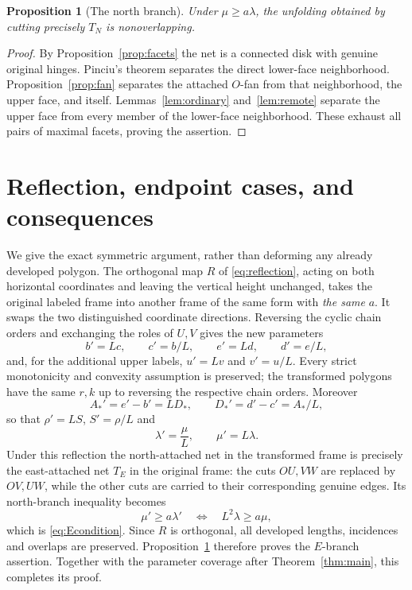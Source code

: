 \documentclass[a4paper,11pt]{amsart}
\newtheorem{proposition}[theorem]{Proposition}
\begin{document}
\begin{proposition}[The north branch]\label{prop:north}
Under $\mu\geq a\lambda$, the unfolding obtained by cutting precisely $T_N$ is nonoverlapping.
\end{proposition}
\begin{proof}
By Proposition~\ref{prop:facets} the net is a connected disk with genuine original hinges. Pinciu's theorem separates the direct lower-face neighborhood. Proposition~\ref{prop:fan} separates the attached $O$-fan from that neighborhood, the upper face, and itself. Lemmas~\ref{lem:ordinary} and~\ref{lem:remote} separate the upper face from every member of the lower-face neighborhood. These exhaust all pairs of maximal facets, proving the assertion.
\end{proof}

\section{Reflection, endpoint cases, and consequences}
We give the exact symmetric argument, rather than deforming any already developed polygon. The orthogonal map $R$ of \eqref{eq:reflection}, acting on both horizontal coordinates and leaving the vertical height unchanged, takes the original labeled frame into another frame of the same form with \emph{the same} $a$. It swaps the two distinguished coordinate directions. Reversing the cyclic chain orders and exchanging the roles of $U,V$ gives the new parameters
\[
 b'=Lc,\qquad c'=b/L,\qquad
 e'=Ld,\qquad d'=e/L,
\]
and, for the additional upper labels, $u'=Lv$ and $v'=u/L$. Every strict monotonicity and convexity assumption is preserved; the transformed polygons have the same $r,k$ up to reversing the respective chain orders. Moreover
\[
 A_*'=e'-b'=LD_*,\qquad
 D_*'=d'-c'=A_*/L,
\]
so that $\rho'=LS$, $S'=\rho/L$ and
\begin{equation}\label{eq:refparameters}
 \lambda'=\frac\mu L,\qquad \mu'=L\lambda.
\end{equation}
Under this reflection the north-attached net in the transformed frame is precisely the east-attached net $T_E$ in the original frame: the cuts $OU,VW$ are replaced by $OV,UW$, while the other cuts are carried to their corresponding genuine edges. Its north-branch inequality becomes
\[
 \mu'\geq a\lambda'
 \quad\Longleftrightarrow\quad
 L^2\lambda\geq a\mu,
\]
which is \eqref{eq:Econdition}. Since $R$ is orthogonal, all developed lengths, incidences and overlaps are preserved. Proposition~\ref{prop:north} therefore proves the $E$-branch assertion. Together with the parameter coverage after Theorem~\ref{thm:main}, this completes its proof.
\end{document}
